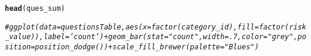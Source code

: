 \documentclass{article}\usepackage[]{graphicx}\usepackage[]{color}
\makeatletter
\newcommand{\hlcom}[1]{\textcolor[rgb]{0.678,0.584,0.686}{\textit{#1}}}%
\newcommand{\hlstd}[1]{\textcolor[rgb]{0.345,0.345,0.345}{#1}}%
\newcommand{\hlkwd}[1]{\textcolor[rgb]{0.737,0.353,0.396}{\textbf{#1}}}%
\newenvironment{kframe}{%
 \def\at@end@of@kframe{}%
 \ifinner\ifhmode%
  \def\at@end@of@kframe{\end{minipage}}%
  \begin{minipage}{\columnwidth}%
 \fi\fi%
 \def\FrameCommand##1{\hskip\@totalleftmargin \hskip-\fboxsep
 \colorbox{shadecolor}{##1}\hskip-\fboxsep
     \hskip-\linewidth \hskip-\@totalleftmargin \hskip\columnwidth}%
 \MakeFramed {\advance\hsize-\width
   \@totalleftmargin\z@ \linewidth\hsize
   \@setminipage}}%
 {\par\unskip\endMakeFramed%
 \at@end@of@kframe}
\newenvironment{knitrout}{}{} %
\makeatother
\begin{document}
\begin{knitrout}
\begin{kframe}
{\ttfamily\noindent\bfseries\color{errorcolor}{\#\# Error in data.frame(structure(list(category\_id = c(1L, 1L, 1L, 1L, 1L, : arguments imply differing number of rows: 14, 5}}\begin{alltt}
\hlkwd{head}\hlstd{(ques_sum)}
\end{alltt}


{\ttfamily\noindent\bfseries\color{errorcolor}{\#\# Error in head(ques\_sum): object 'ques\_sum' not found}}\begin{alltt}
\hlcom{#ggplot(data=questionsTable, aes(x=factor(category_id), fill=factor(risk_value)), label='count') + geom_bar(stat="count", width =.7, color="grey", position=position_dodge()) + scale_fill_brewer(palette="Blues")}
\end{alltt}
\end{kframe}
\end{knitrout}
\end{document}
